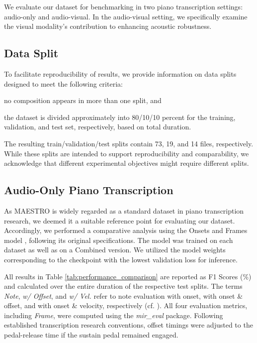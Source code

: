 \documentclass{article}
\begin{document}
We evaluate our dataset for benchmarking in two piano transcription settings: audio-only and audio-visual. In the audio-visual setting, we specifically examine the visual modality's contribution to enhancing acoustic robustness. 

\subsection{Data Split}
To facilitate reproducibility of results, we provide information on data splits designed to meet the following criteria: 
\begin{inparaenum}[(i)]
    \item no composition appears in more than one split, and 
    \item the dataset is divided approximately into 80/10/10 percent for the training, validation, and test set, respectively, based on total duration. 
\end{inparaenum}
The resulting train/validation/test splits contain 73, 19, and 14 files, respectively. While these splits are intended to support reproducibility and comparability, we acknowledge that different experimental objectives might require different splits.

\subsection{Audio-Only Piano Transcription}
As MAESTRO is widely regarded as a standard dataset in piano transcription research, we deemed it a suitable reference point for evaluating our dataset. Accordingly, we performed a comparative analysis using the Onsets and Frames model \cite{ISMIR18Hawthorne}, following its original specifications. The model was trained on each dataset as well as on a Combined version. We utilized the model weights corresponding to the checkpoint with the lowest validation loss for inference. 

All results in Table \ref{tab:performance_comparison} are reported as F1 Scores (\%) and calculated over the entire duration of the respective test splits. The terms \textit{Note}, \textit{w/ Offset}, and \textit{w/ Vel.} refer to note evaluation with onset, with onset \& offset, and with onset \& velocity, respectively (cf. \cite{TASLP21Kong}). All four evaluation metrics, including \textit{Frame}, were computed using the \textit{mir\_eval} package. Following established transcription research conventions, offset timings were adjusted to the pedal-release time if the sustain pedal remained engaged.
\end{document}
